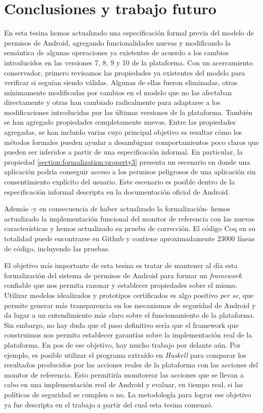 \chapter{Conclusiones y trabajo futuro}

En esta tesina hemos actualizado una especificación formal previa del modelo de permisos de
Android\cite{luna-cleiej,betarte-2016}, agregando funcionalidades nuevas y modificando la semántica
de algunas operaciones ya existentes de acuerdo a los cambios introducidos en las versiones 7, 8, 9
y 10 de la plataforma. Con un acercamiento conservador, primero revisamos las propiedades ya
existentes del modelo para verificar si seguían siendo válidas. Algunas de ellas fueron eliminadas,
otras mínimamente modificadas por cambios en el modelo que no las afectaban directamente y otras han
cambiado radicalmente para adaptarse a los modificaciones introducidas por las últimas versiones de
la plataforma. También se han agregado propiedades completamente nuevas. Entre las propiedades
agregadas, se han incluido varias cuyo principal objetivo es resaltar cómo los métodos formales
pueden ayudar a desambiguar comportamientos poco claros que pueden ser inferidos a partir de una
especificación informal. En particular, la propiedad \ref{section:formalization:property3} presenta
un escenario en donde una aplicación podría conseguir acceso a los permisos peligrosos de una
aplicación sin consentimiento explícito del usuario. Este escenario es posible dentro de la
especificación informal descripta en la documentación oficial de Android.

Además -y en consecuencia de haber actualizado la formalización- hemos actualizado la implementación
funcional del monitor de referencia con las nuevas características y hemos actualizado su prueba de
corrección. El código Coq en su totalidad puede encontrarse en Github\cite{github-code} y contiene
aproximadamente 23000 líneas de código, incluyendo las pruebas.

El objetivo más importante de esta tesina es tratar de mantener al día esta formalización del
sistema de permisos de Android para formar un \textit{framework} confiable que nos permita razonar y
establecer propiedades sobre el mismo. Utilizar modelos idealizados y prototipos certificados es
algo positivo \textit{per se}, que permite generar más transparencia en los mecanismos de seguridad
de Android y da lugar a un entendimiento más claro sobre el funcionamiento de la plataforma. Sin
embargo, no hay duda que el paso definitivo sería que el framework que construimos nos permita
establecer garantías sobre la implementación real de la plataforma. En pos de ese objetivo, hay
mucho trabajo por delante aún. Por ejemplo, es posible utilizar el programa extraído en
\textit{Haskell} para comparar los resultados producidos por las acciones reales de la plataforma
con las acciones del monitor de referencia. Esto permitiría monitorear las acciones que se llevan a
cabo en una implementación real de Android y evaluar, en tiempo real, si las políticas de seguridad
se cumplen o no. La metodología para lograr ese objetivo ya fue descripta en el trabajo a partir del
cual esta tesina comenzó\cite{luna-cleiej}.

